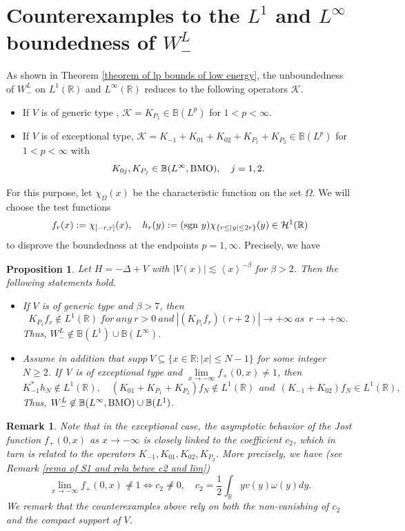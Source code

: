 \documentclass[reqno]{amsart}
\newtheorem{remark}[definition]{Remark}
\newtheorem{proposition}[definition]{Proposition}
\newcommand\R{\mathbb{R}}
\newcommand\B{\mathbb{B}}
\newcommand\mcaK{\mathcal{K}}
\newcommand\HH{\mathcal{H}}
\numberwithin{equation}{section}
\begin{document}
\section{Counterexamples to the $L^{1}$ and $L^{\infty}$ boundedness of $W^L_{-}$} \label{sec of counterex}
As shown in Theorem \ref{theorem of lp bounds of low energy}, the unboundedness of $W^L_{-}$ on $L^1(\R)$ and $L^{\infty}(\R)$ reduces to the following operators $\mcaK$. 
\begin{itemize}
\item If $V$ is of generic type , $\mcaK=K_{P_1}\in\B(L^p)$ for $1<p<\infty$.
\item If $V$ is of exceptional type, $\mcaK=K_{-1}+K_{01}+K_{02}+K_{P_1}+K_{P_2}\in\B(L^p)$ for $1<p<\infty$ with
$$K_{0j},K_{P_j}\in\B(L^{\infty},{\rm BMO}),\quad j=1,2.$$
\end{itemize}
For this purpose, let  $\chi_{\Omega}(x)$ be the characteristic function on the set $\Omega$. We will choose the test functions
$$f_{r}(x):=\chi_{[-r,r]}(x),\quad h_r(y):=({\rm sgn}\ y)\chi_{\{r\leq|y|\leq2r\}}(y)\in \HH^1(\R)$$
to disprove the boundedness at the endpoints $p=1,\infty$. Precisely, we have
\begin{proposition}
Let $H=-\Delta+V$ with $|V(x)|\lesssim \left<x\right>^{-\beta}$ for $\beta>2$. Then the following statements hold.
\begin{itemize} 
\item [{\rm(1)}] If $V$ is of generic type and $\beta>7$, then
$${K_{P_1}}f_{r}\notin L^1(\R)\ for\ any\ r>0\ and\  |(K_{P_1}f_{r})(r+2)|\rightarrow+\infty\ as\ \ r\rightarrow +\infty.$$
Thus, $W^L_{-}\not\in\B(L^1)\cup\B(L^{\infty})$.
\item  [{\rm(2)}] Assume in addition that $supp \ V\subseteq\{x\in\R: |x|\leq N-1\}$ for some integer $N\geq2$. If V is of exceptional type and $\lim\limits_{x\rightarrow-\infty}f_{+}(0,x)\neq1$, then 
\begin{equation*}
K^*_{-1}h_N\not\in L^1(\R),\quad 
(K_{01}+K_{P_1}+K_{P_2})f_N\not\in L^1(\R)\ \ and\ \ (K_{-1}+K_{02})f_{N}\in L^1(\R),
\end{equation*}
Thus, $W^L_{-}\not\in \B(L^{\infty},{\rm BMO})\cup\B(L^1)$.
\end{itemize}
\end{proposition}
\begin{remark}
{\rm Note that in the exceptional case, the asymptotic behavior of the Jost function $f_+(0,x)$ as $x\rightarrow-\infty$ is closely linked to the coefficient $c_2$, which in turn is related to the operators 
$K_{-1},K_{01},K_{02},K_{P_2}$. More precisely, we have (see Remark \ref{rema of S1 and rela betwe c2 and lim})
\begin{equation}\label{rela between c2 and limit}
\lim\limits_{x\rightarrow-\infty}f_{+}(0,x)\not\neq1\Longleftrightarrow c_2\not\neq0,\quad c_2=\frac{1}{2}\int_{\R}yv(y)\omega(y)dy.
 \end{equation}
We remark that the counterexamples above rely on both the non-vanishing of $c_2$ and the compact support of $V$. 
}
\end{remark}
\end{document}
